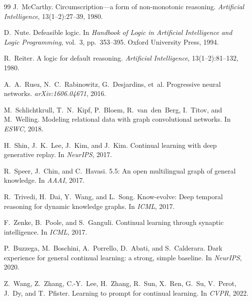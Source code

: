 \documentclass[11pt,a4paper]{article}
\theoremstyle{definition}
\begin{document}
\begin{thebibliography}{99}
J.~McCarthy.
\newblock Circumscription---a form of non-monotonic reasoning.
\newblock \emph{Artificial Intelligence}, 13(1--2):27--39, 1980.

D.~Nute.
\newblock Defeasible logic.
\newblock In \emph{Handbook of Logic in Artificial Intelligence and Logic Programming},
  vol.~3, pp.\ 353--395. Oxford University Press, 1994.

R.~Reiter.
\newblock A logic for default reasoning.
\newblock \emph{Artificial Intelligence}, 13(1--2):81--132, 1980.

A.~A.~Rusu, N.~C.~Rabinowitz, G.~Desjardins, et~al.
\newblock Progressive neural networks.
\newblock \emph{arXiv:1606.04671}, 2016.

M.~Schlichtkrull, T.~N.~Kipf, P.~Bloem, R.~van~den~Berg, I.~Titov, and M.~Welling.
\newblock Modeling relational data with graph convolutional networks.
\newblock In \emph{ESWC}, 2018.

H.~Shin, J.~K.~Lee, J.~Kim, and J.~Kim.
\newblock Continual learning with deep generative replay.
\newblock In \emph{NeurIPS}, 2017.

R.~Speer, J.~Chin, and C.~Havasi.
 5.5: An open multilingual graph of general knowledge.
\newblock In \emph{AAAI}, 2017.

R.~Trivedi, H.~Dai, Y.~Wang, and L.~Song.
\newblock Know-evolve: Deep temporal reasoning for dynamic knowledge graphs.
\newblock In \emph{ICML}, 2017.

F.~Zenke, B.~Poole, and S.~Ganguli.
\newblock Continual learning through synaptic intelligence.
\newblock In \emph{ICML}, 2017.


P.~Buzzega, M.~Boschini, A.~Porrello, D.~Abati, and S.~Calderara.
\newblock Dark experience for general continual learning: a strong, simple
  baseline.
\newblock In \emph{NeurIPS}, 2020.

Z.~Wang, Z.~Zhang, C.-Y.~Lee, H.~Zhang, R.~Sun, X.~Ren, G.~Su, V.~Perot,
  J.~Dy, and T.~Pfister.
\newblock Learning to prompt for continual learning.
\newblock In \emph{CVPR}, 2022.


\end{thebibliography}
\end{document}
